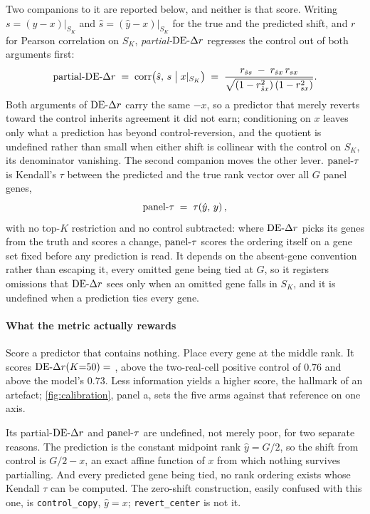 Two companions to it are reported below, and neither is that score. Writing
$s = (y-x)|_{S_K}$ and $\hat{s} = (\hat{y}-x)|_{S_K}$ for the true and the
predicted shift, and $r$ for Pearson correlation on $S_K$,
\emph{partial-}$\textrm{DE-}\Delta r$ regresses the control out of both arguments first:
\begin{equation}
 \textrm{partial-}\textrm{DE-}\Delta r \;=\;
 \operatorname{corr}\!\big( \hat{s}, \, s \;\big|\; x|_{S_K} \big)
 \;=\;
 \frac{r_{\hat{s}s} \;-\; r_{\hat{s}x}\, r_{sx}}
      {\sqrt{\left(1 - r_{\hat{s}x}^{2}\right)\left(1 - r_{sx}^{2}\right)}}.
\end{equation}
Both arguments of $\textrm{DE-}\Delta r$ carry the same $-x$, so a predictor that merely
reverts toward the control inherits agreement it did not earn; conditioning on
$x$ leaves only what a prediction has beyond control-reversion, and the quotient
is undefined rather than small when either shift is collinear with the control
on $S_K$, its denominator vanishing. The second companion moves the other lever.
$\textrm{panel-}\tau$ is Kendall's $\tau$ between the predicted and the true rank vector
over all $G$ panel genes,
\begin{equation}
 \textrm{panel-}\tau \;=\; \tau\!\left(\hat{y}, \, y\right),
\end{equation}
with no top-$K$ restriction and no control subtracted: where $\textrm{DE-}\Delta r$ picks its
genes from the truth and scores a change, $\textrm{panel-}\tau$ scores the ordering itself
on a gene set fixed before any prediction is read. It depends on the absent-gene
convention rather than escaping it, every omitted gene being tied at $G$, so it
registers omissions that $\textrm{DE-}\Delta r$ sees only when an omitted gene falls in $S_K$,
and it is undefined when a prediction ties every gene.

\paragraph{What the metric actually rewards} Score a predictor that contains
nothing. Place every gene at the middle rank. It scores $\textrm{DE-}\Delta r(K{=}50) =$
, above the two-real-cell positive control of
$0.76$ and above the model's $0.73$. Less information yields a higher score,
the hallmark of an artefact; \cref{fig:calibration}, panel a, sets the five arms
against that reference on one axis.

Its partial-$\textrm{DE-}\Delta r$ and $\textrm{panel-}\tau$ are undefined, not merely poor, for two
separate reasons. The prediction is the constant midpoint rank $\hat y = G/2$,
so the shift from control is $G/2 - x$, an exact affine function of $x$ from
which nothing survives partialling. And every predicted gene being tied, no rank
ordering exists whose Kendall $\tau$ can be computed. The zero-shift
construction, easily confused with this one, is \texttt{control\_copy},
$\hat y = x$; \texttt{revert\_center} is not it.

